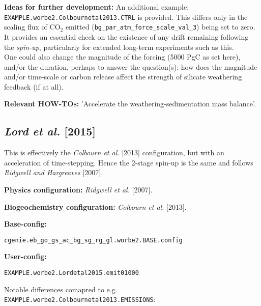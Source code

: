 \documentclass[10pt,twoside]{article}
\begin{document}
\noindent \textbf{Ideas for further development:} An additional example: \texttt{EXAMPLE.worbe2.Colbournetal2013.CTRL} is provided. This differs only in the scaling flux of CO$_{2}$ emitted (\texttt{bg\_par\_atm\_force\_scale\_val\_3}) being set to zero. It provides an essential check on the existence of any drift remaining following the \textit{spin-up}, particularly for extended long-term experiments such as this.
\\One could also change the magnitude of the forcing (5000 PgC as set here), and/or the duration, perhaps to answer the question(s): how does the magnitude and/or time-scale or carbon release affect the strength of silicate weathering feedback (if at all). 

\noindent \textbf{Relevant HOW-TOs:} 'Accelerate the weathering-sedimentation mass balance'.


\subsection{\textit{Lord et al.} [2015]}

This is effectively the \textit{Colbourn et al.} [2013] configuration, but with an acceleration of time-stepping. Hence the 2-stage spin-up is the same and follows \textit{Ridgwell and Hargreaves} [2007].

\noindent \textbf{Physics configuration:} \textit{Ridgwell et al.} [2007].

\noindent \textbf{Biogeochemistry configuration:} \textit{Colbourn et al.} [2013].

\noindent \textbf{Base-config:}
\vspace{-10pt}\begin{verbatim}cgenie.eb_go_gs_ac_bg_sg_rg_gl.worbe2.BASE.config\end{verbatim}\vspace{-10pt}

\noindent \textbf{User-config:} 
\vspace{-10pt}\begin{verbatim}EXAMPLE.worbe2.Lordetal2015.emit01000\end{verbatim}\vspace{-10pt}

Notable differences comapred to e.g. \texttt{EXAMPLE.worbe2.Colbournetal2013.EMISSIONS}:
\end{document}
